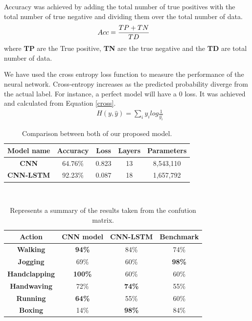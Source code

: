 \documentclass{vldb}
\begin{document}
Accuracy was achieved by adding the total number of true positives with the total number of true negative and dividing them over the total number of data.
\begin{align}
   & \large Acc=\frac{TP + TN}{TD}
\end{align}
where \textbf{TP} are the True positive, \textbf{TN} are the true negative and the \textbf{TD} are total number of data.

We have used the cross entropy loss function \cite{zhang2018generalized} to measure the performance of the neural network. Cross-entropy increases as the predicted probability diverge from the actual label. For instance, a perfect model will have a 0 loss. It was achieved and calculated from Equation \ref{cross}.
\begin{align} \label{cross}
    & H(y,\widehat{y}) = \sum_{i}y_{i}log\frac{1}{\widehat{y_{i}}}
\end{align}


\begin{table}[h]
\centering
\caption{Comparison between both of our proposed
model.}
\begin{tabular}{|c|c|c|c|c|}
\hline
\textbf{Model name} & \textbf{Accuracy} & \textbf{Loss} & \textbf{Layers} & \textbf{Parameters} \\ \hline
\textbf{CNN}        & 64.76\%            & 0.823         & 13              & 8,543,110           \\ \hline
\textbf{CNN-LSTM}   & 92.23\%            & 0.087         & 18              & 1,657,792           \\ \hline
\end{tabular}
\label{accuracyloss}
\end{table}\\



\begin{table}[ht]
\centering
\begin{tabular}{|c|c|c|c|}
\hline
\textbf{Action} & \textbf{CNN model} & \textbf{CNN-LSTM} & \textbf{Benchmark} \\ \hline
\textbf{Walking} & \textbf{94\%} & 84\% & 74\% \\ \hline
\textbf{Jogging} & 69\% & 60\% & \textbf{98\%} \\ \hline
\textbf{Handclapping} & \textbf{100\% }& 60\% & 60\% \\ \hline
\textbf{Handwaving} & 72\% & \textbf{74\%} & 55\% \\ \hline
\textbf{Running} & \textbf{64\%} & 55\% & 60\% \\ \hline
\textbf{Boxing} & 14\% & \textbf{98\%} & 84\% \\ \hline
\end{tabular}
\caption{Represents a summary of the results taken from the confution matrix.}
\label{confusionmatrixtable}
\end{table}\\
\end{document}
